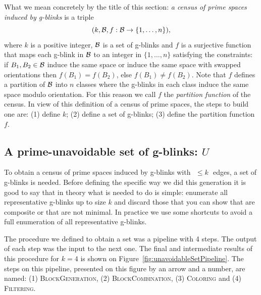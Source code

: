 \newpage

What we mean concretely by the title of this section:
{\em a census of prime spaces induced by
g-blinks} is a triple \vspace{-0.3cm}$$(k,{\cal B},f:{\cal B}
\rightarrow \{1, \ldots, n\}),\vspace{-0.3cm}$$ where $k$ is a
positive integer, ${\cal B}$ is a \kpu set of g-blinks and $f$ is a
surjective function that maps each g-blink in ${\cal B}$ to an integer
in $\{1, \ldots, n\}$ satisfying the constraints: if $B_1,B_2 \in
{\cal B}$ induce the same space or induce the same space with
swapped orientations then $f(B_1) = f(B_2)$, else
$f(B_1) \neq f(B_2)$. Note that $f$ defines a partition of ${\cal B}$
into $n$ classes where the g-blinks in each class induce the same space
modulo orientation. For this reason we call $f$ the
{\em partition function} of the census. In view of this definition of a
census of prime spaces, the steps to build one are: (1) define $k$;
(2) define a \kpu set of g-blinks; (3) define the partition function $f$.

\subsection{A prime-unavoidable set of g-blinks: $U$}

To obtain a census of prime spaces induced by g-blinks with $\,\,\leq
k \,\,$ edges, a set of \kpu g-blinks is needed. Before defining the
specific way we did this generation it is good to say that in theory
what is needed to do is simple: enumerate all representative g-blinks up to size
$k$ and discard those that you can show that are composite or that are
not minimal. In practice we use some shortcuts to avoid a full
enumeration of all representative g-blinks.

The procedure we defined to obtain a \kpu set was a pipeline with 4
steps. The output of each step was the input to the next one. The
final and intermediate results of this procedure for $k=4$ is shown
on Figure~\ref{fig:unavoidableSetPipeline}. The steps on this pipeline,
presented on this figure by an arrow and a number, are named:
(1) \textsc{BlockGeneration}, (2) \textsc{BlockCombination}, (3) \textsc{Coloring}
and (4) \textsc{Filtering}.

